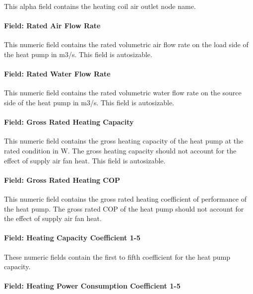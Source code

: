 This alpha field contains the heating coil air outlet node name.

\paragraph{Field: Rated Air Flow Rate}\label{field-rated-air-flow-rate-6}

This numeric field contains the rated volumetric air flow rate on the load side of the heat pump in m3/s. This field is autosizable.

\paragraph{Field: Rated Water Flow Rate}\label{field-rated-water-flow-rate-1}

This numeric field contains the rated volumetric water flow rate on the source side of the heat pump in m3/s. This field is autosizable.

\paragraph{Field: Gross Rated Heating Capacity}\label{field-gross-rated-heating-capacity-4}

This numeric field contains the gross heating capacity of the heat pump at the rated condition in W. The gross heating capacity should not account for the effect of supply air fan heat. This field is autosizable.

\paragraph{Field: Gross Rated Heating COP}\label{field-gross-rated-heating-cop-1}

This numeric field contains the gross rated heating coefficient of performance of the heat pump. The gross rated COP of the heat pump should not account for the effect of supply air fan heat.

\paragraph{Field: Heating Capacity Coefficient 1-5}\label{field-heating-capacity-coefficient-1-5}

These numeric fields contain the first to fifth coefficient for the heat pump capacity.

\paragraph{Field: Heating Power Consumption Coefficient 1-5}\label{field-heating-power-consumption-coefficient-1-5}

